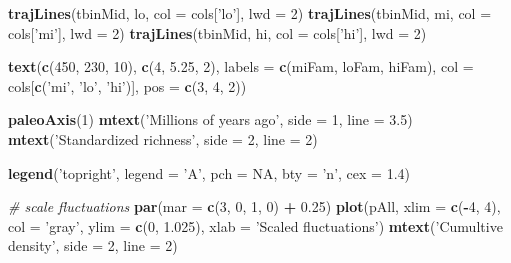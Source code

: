 \documentclass[]{article}
\newenvironment{Shaded}{\begin{snugshade}}{\end{snugshade}}
\newcommand{\KeywordTok}[1]{\textcolor[rgb]{0.13,0.29,0.53}{\textbf{#1}}}
\newcommand{\DataTypeTok}[1]{\textcolor[rgb]{0.13,0.29,0.53}{#1}}
\newcommand{\DecValTok}[1]{\textcolor[rgb]{0.00,0.00,0.81}{#1}}
\newcommand{\FloatTok}[1]{\textcolor[rgb]{0.00,0.00,0.81}{#1}}
\newcommand{\StringTok}[1]{\textcolor[rgb]{0.31,0.60,0.02}{#1}}
\newcommand{\CommentTok}[1]{\textcolor[rgb]{0.56,0.35,0.01}{\textit{#1}}}
\newcommand{\OtherTok}[1]{\textcolor[rgb]{0.56,0.35,0.01}{#1}}
\newcommand{\OperatorTok}[1]{\textcolor[rgb]{0.81,0.36,0.00}{\textbf{#1}}}
\newcommand{\NormalTok}[1]{#1}
\begin{document}
\begin{Shaded}
\begin{Highlighting}[]
{\KeywordTok{trajLines}\NormalTok{(tbinMid, lo, }\DataTypeTok{col =}\NormalTok{ cols[}\StringTok{'lo'}\NormalTok{], }\DataTypeTok{lwd =} \DecValTok{2}\NormalTok{)}
\KeywordTok{trajLines}\NormalTok{(tbinMid, mi, }\DataTypeTok{col =}\NormalTok{ cols[}\StringTok{'mi'}\NormalTok{], }\DataTypeTok{lwd =} \DecValTok{2}\NormalTok{)}
\KeywordTok{trajLines}\NormalTok{(tbinMid, hi, }\DataTypeTok{col =}\NormalTok{ cols[}\StringTok{'hi'}\NormalTok{], }\DataTypeTok{lwd =} \DecValTok{2}\NormalTok{)}

\KeywordTok{text}\NormalTok{(}\KeywordTok{c}\NormalTok{(}\DecValTok{450}\NormalTok{, }\DecValTok{230}\NormalTok{, }\DecValTok{10}\NormalTok{), }\KeywordTok{c}\NormalTok{(}\DecValTok{4}\NormalTok{, }\FloatTok{5.25}\NormalTok{, }\DecValTok{2}\NormalTok{), }\DataTypeTok{labels =} \KeywordTok{c}\NormalTok{(miFam, loFam, hiFam), }
     \DataTypeTok{col =}\NormalTok{ cols[}\KeywordTok{c}\NormalTok{(}\StringTok{'mi'}\NormalTok{, }\StringTok{'lo'}\NormalTok{, }\StringTok{'hi'}\NormalTok{)], }\DataTypeTok{pos =} \KeywordTok{c}\NormalTok{(}\DecValTok{3}\NormalTok{, }\DecValTok{4}\NormalTok{, }\DecValTok{2}\NormalTok{))}

\KeywordTok{paleoAxis}\NormalTok{(}\DecValTok{1}\NormalTok{)}
\KeywordTok{mtext}\NormalTok{(}\StringTok{'Millions of years ago'}\NormalTok{, }\DataTypeTok{side =} \DecValTok{1}\NormalTok{, }\DataTypeTok{line =} \FloatTok{3.5}\NormalTok{)}
\KeywordTok{mtext}\NormalTok{(}\StringTok{'Standardized richness'}\NormalTok{, }\DataTypeTok{side =} \DecValTok{2}\NormalTok{, }\DataTypeTok{line =} \DecValTok{2}\NormalTok{)}

\KeywordTok{legend}\NormalTok{(}\StringTok{'topright'}\NormalTok{, }\DataTypeTok{legend =} \StringTok{'A'}\NormalTok{, }\DataTypeTok{pch =} \OtherTok{NA}\NormalTok{, }\DataTypeTok{bty =} \StringTok{'n'}\NormalTok{, }\DataTypeTok{cex =} \FloatTok{1.4}\NormalTok{)}

\CommentTok{# scale fluctuations}
\KeywordTok{par}\NormalTok{(}\DataTypeTok{mar =} \KeywordTok{c}\NormalTok{(}\DecValTok{3}\NormalTok{, }\DecValTok{0}\NormalTok{, }\DecValTok{1}\NormalTok{, }\DecValTok{0}\NormalTok{) }\OperatorTok{+}\StringTok{ }\FloatTok{0.25}\NormalTok{)}
\KeywordTok{plot}\NormalTok{(pAll, }\DataTypeTok{xlim =} \KeywordTok{c}\NormalTok{(}\OperatorTok{-}\DecValTok{4}\NormalTok{, }\DecValTok{4}\NormalTok{), }\DataTypeTok{col =} \StringTok{'gray'}\NormalTok{, }\DataTypeTok{ylim =} \KeywordTok{c}\NormalTok{(}\DecValTok{0}\NormalTok{, }\FloatTok{1.025}\NormalTok{),}
     \DataTypeTok{xlab =} \StringTok{'Scaled fluctuations'}\NormalTok{)}
\KeywordTok{mtext}\NormalTok{(}\StringTok{'Cumultive density'}\NormalTok{, }\DataTypeTok{side =} \DecValTok{2}\NormalTok{, }\DataTypeTok{line =} \DecValTok{2}\NormalTok{)}

}
\end{Highlighting}
\end{Shaded}
\end{document}
